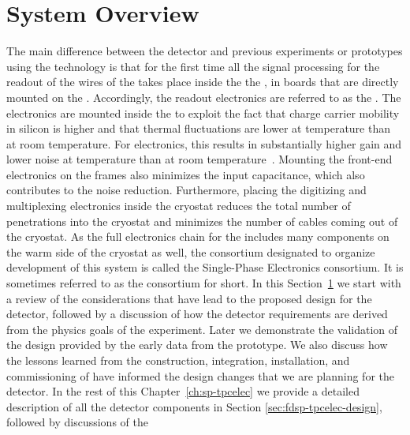 \section{System Overview}
\label{sec:fdsp-tpcelec-overview}

The main difference between the   detector and 
previous experiments or prototypes using the  technology is
that for the first time all the signal processing for the readout of the
wires of the  takes place inside the the , in boards that 
are directly mounted on the . Accordingly, the  
readout electronics are referred to as the . The electronics are 
mounted inside the  to exploit the fact that charge carrier 
mobility in silicon is higher and that thermal fluctuations are lower 
at  temperature than at room temperature. For  
electronics, this results in substantially higher gain and lower noise 
at  temperature than at room temperature~\cite{DeGeronimo:2011zz}.
Mounting the front-end electronics on the  frames also minimizes 
the input capacitance, which also contributes to the noise reduction.  
Furthermore, placing the digitizing and multiplexing electronics inside 
the cryostat reduces the total number of penetrations into the cryostat 
and minimizes the number of cables coming out of the cryostat.  
As the full  electronics chain for the  includes 
many components on the warm side of the cryostat as well, the  
consortium designated to organize development of this system is called 
the  Single-Phase  Electronics consortium. 
It is sometimes referred to as the  consortium for short.
In this Section~\ref{sec:fdsp-tpcelec-overview} we start with a review of the considerations that
have lead to the proposed design for the   detector,
followed by a discussion of how the detector requirements are derived
from the physics goals of the experiment. Later we demonstrate the 
validation of the design provided by the early data from the 
prototype. We also discuss how the lessons learned from the construction,
integration, installation, and commissioning of  have 
informed the design changes that we are planning for the 
 detector. In the rest of this Chapter~\ref{ch:sp-tpcelec} we provide a detailed
description of all the  detector components in Section
\ref{sec:fdsp-tpcelec-design}, followed by discussions of the 
